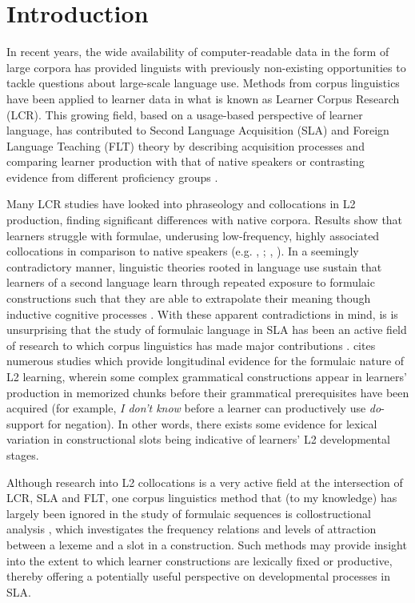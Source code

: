 \setcounter{page}{1} 

\section{Introduction}

In recent years, the wide availability of computer-readable data in the form of large corpora has provided linguists with previously non-existing opportunities to tackle questions about large-scale language use.
Methods from corpus linguistics have been applied to learner data in what is known as Learner Corpus Research (LCR).
This growing field, based on a usage-based perspective of learner language, has contributed to Second Language Acquisition (SLA) and Foreign Language Teaching (FLT) theory 
by describing acquisition processes and comparing learner production with that of native speakers or contrasting evidence from different proficiency groups \citep{learnercorpusRoemer2026}. 
 
Many LCR studies have looked into phraseology and collocations in L2 production, finding significant differences with native corpora. 
Results show that learners struggle with formulae, underusing low-frequency, highly associated collocations in comparison to native speakers (e.g. \citeauthor{durrantWhatExtentNative2009}, \citeyear{durrantWhatExtentNative2009}; \citeauthor{granger2014use}, \citeyear{granger2014use}).
In a seemingly contradictory manner, linguistic theories rooted in language use sustain that learners of a second language learn through repeated exposure to formulaic constructions such that they are able to extrapolate their meaning though inductive cognitive processes \citep{Ellis_2012}.
With these apparent contradictions in mind, is is unsurprising that the study of formulaic language in SLA has been an active field of research to which corpus linguistics has made major contributions \citep{McEnery_Brezina_Gablasova_Banerjee_2019}. \cite{Ellis_2012} cites numerous studies which provide longitudinal evidence for the formulaic nature of L2 learning,
wherein some complex grammatical constructions appear in learners' production in memorized chunks before their grammatical prerequisites have been acquired (for example, \textit{I don't know} before a learner can productively use \textit{do}-support for negation).
In other words, there exists some evidence for lexical variation in constructional slots being indicative of learners' L2 developmental stages.


Although research into L2 collocations is a very active field at the intersection of LCR, SLA and FLT, one corpus linguistics method that (to my knowledge) has largely been ignored in the  study of formulaic sequences is collostructional analysis \citep{stefanowitschCollostructionsInvestigatingInteraction2003,griesExtendingCollostructionalAnalysis2004,griesOverhaulingCollostructionalAnalysis2023}, which investigates the frequency relations and levels of attraction between a lexeme and a slot in a construction.
Such methods may provide insight into the extent to which learner constructions are lexically fixed or productive, thereby offering a potentially useful perspective on developmental processes in SLA.


